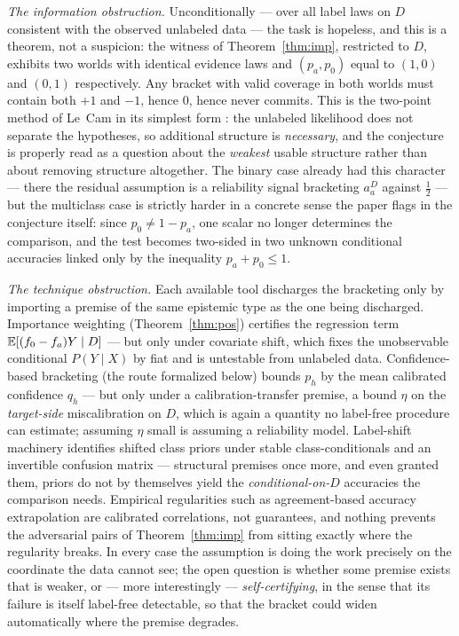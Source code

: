\emph{The information obstruction.} Unconditionally --- over all label laws on $D$
consistent with the observed unlabeled data --- the task is hopeless, and this is a
theorem, not a suspicion: the witness of Theorem~\ref{thm:imp}, restricted to $D$,
exhibits two worlds with identical evidence laws and $(p_a,p_0)$ equal to $(1,0)$ and
$(0,1)$ respectively. Any bracket with valid coverage in both worlds must contain both
$+1$ and $-1$, hence $0$, hence never commits. This is the two-point method of Le~Cam
in its simplest form \cite{lecam1973convergence,tsybakov2009introduction}: the
unlabeled likelihood does not separate the hypotheses, so additional structure is
\emph{necessary}, and the conjecture is properly read as a question about the
\emph{weakest} usable structure rather than about removing structure altogether. The
binary case already had this character --- there the residual assumption is a
reliability signal bracketing $a_a^D$ against $\tfrac12$ --- but the multiclass case is
strictly harder in a concrete sense the paper flags in the conjecture itself: since
$p_0\neq1-p_a$, one scalar no longer determines the comparison, and the test becomes
two-sided in two unknown conditional accuracies linked only by the inequality
$p_a+p_0\le1$.

\emph{The technique obstruction.} Each available tool discharges the bracketing only by
importing a premise of the same epistemic type as the one being discharged.
Importance weighting (Theorem~\ref{thm:pos}) certifies the regression term
$\mathbb{E}[(f_0-f_a)Y\mid D]$ --- but only under covariate shift, which fixes the unobservable
conditional $P(Y\mid X)$ by fiat and is untestable from unlabeled data. Confidence-based
bracketing (the route formalized below) bounds $p_h$ by the mean calibrated confidence
$q_h$ --- but only under a calibration-transfer premise, a bound $\eta$ on the
\emph{target-side} miscalibration on $D$, which is again a quantity no label-free
procedure can estimate; assuming $\eta$ small is assuming a reliability model.
Label-shift machinery \cite{lipton2018detecting} identifies shifted class priors under
stable class-conditionals and an invertible confusion matrix --- structural premises
once more, and even granted them, priors do not by themselves yield the
\emph{conditional-on-$D$} accuracies the comparison needs. Empirical regularities such
as agreement-based accuracy extrapolation are calibrated correlations, not guarantees,
and nothing prevents the adversarial pairs of Theorem~\ref{thm:imp} from sitting
exactly where the regularity breaks. In every case the assumption is doing the work
precisely on the coordinate the data cannot see; the open question is whether some
premise exists that is weaker, or --- more interestingly --- \emph{self-certifying}, in
the sense that its failure is itself label-free detectable, so that the bracket could
widen automatically where the premise degrades.

